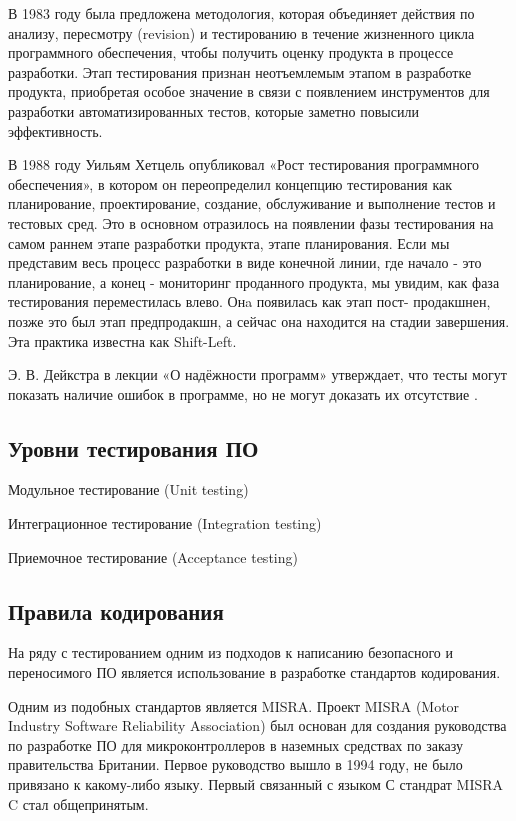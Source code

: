 В 1983 году была предложена методология, которая объединяет действия по анализу, пересмотру 
(revision) и тестированию в течение жизненного цикла программного обеспечения, чтобы получить 
оценку продукта в процессе разработки. Этап тестирования признан неотъемлемым этапом в 
разработке продукта, приобретая особое значение в связи с появлением инструментов для разработки 
автоматизированных тестов, которые заметно повысили эффективность.

В 1988 году Уильям Хетцель опубликовал «Рост тестирования программного обеспечения», в котором 
он переопределил концепцию тестирования как планирование, проектирование, создание, обслуживание 
и выполнение тестов и тестовых сред. Это  в основном отразилось на появлении фазы тестирования 
на самом раннем этапе разработки продукта, этапе планирования. Если мы представим весь процесс 
разработки в виде конечной линии, где начало - это планирование, а конец - мониторинг проданного 
продукта, мы увидим, как фаза тестирования переместилась влево. Онa появилась как этап пост-
продакшнен, позже это был этап предпродакшн, а сейчас она находится на стадии завершения. Эта 
практика известна как Shift-Left.

Э. В. Дейкстра в лекции «О надёжности программ» утверждает, что тесты могут показать наличие 
ошибок в программе, но не могут доказать их отсутствие .

\subsection{Уровни тестирования ПО}


Модульное тестирование (Unit testing)

Интеграционное тестирование (Integration testing)

Приемочное тестирование (Acceptance testing)



\subsection{Правила кодирования}

На ряду с тестированием одним из подходов к написанию безопасного и переносимого ПО 
является использование в разработке стандартов кодирования. 

Одним из подобных стандартов является MISRA. Проект MISRA (Motor Industry Software Reliability 
Association) был основан для создания руководства по разработке ПО для микроконтроллеров в 
наземных средствах по заказу правительства Британии. Первое руководство вышло в 1994 году, не 
было привязано к какому-либо языку. Первый связанный с языком С стандрат MISRA C стал 
общепринятым.

